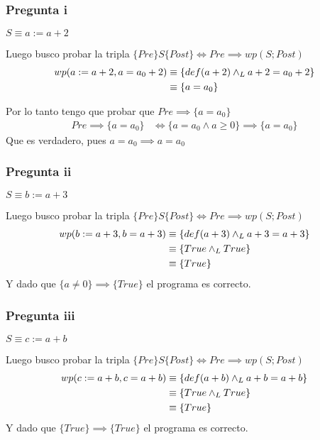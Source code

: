 \subsubsection{Pregunta i}
$ S \equiv a := a+2 $

Luego busco probar la tripla $ \{ Pre \}S\{ Post \} \iff Pre \implies wp(S; Post) $
\begin{align*}
    wp(a := a+2, a = a_0 + 2) &\equiv \{ def(a+2) \land _L a + 2 = a_0 + 2 \} \\
    &\equiv \{ a = a_0 \} \\
\end{align*}

Por lo tanto tengo que probar que $ Pre \implies \{ a = a_0 \} $
\begin{align*}
    Pre \implies \{ a = a_0 \} &\iff \{ a = a_0 \wedge a \geq 0 \} \implies \{ a = a_0 \}
\end{align*}
Que es verdadero, pues $ a = a_0 \implies a = a_0 $

\subsubsection{Pregunta ii}
$ S \equiv b := a + 3 $

Luego busco probar la tripla $ \{ Pre \}S\{ Post \} \iff Pre \implies wp(S; Post) $
\begin{align*}
    wp(b := a + 3, b = a + 3) &\equiv \{ def(a+3) \land _L a + 3 = a+3 \} \\
    &\equiv \{ True \land _L True \} \\
    &\equiv \{ True \} \\
\end{align*}
Y dado que $ \{ a \neq 0 \} \implies \{ True \} $ el programa es correcto.

\subsubsection{Pregunta iii}
$ S \equiv c := a+b $

Luego busco probar la tripla $ \{ Pre \}S\{ Post \} \iff Pre \implies wp(S; Post) $
\begin{align*}
    wp(c := a + b, c = a + b) &\equiv \{ def(a+b) \land _L a + b = a+b \} \\
    &\equiv \{ True \land _L True \} \\
    &\equiv \{ True \} \\
\end{align*}
Y dado que $ \{ True \} \implies \{ True \} $ el programa es correcto.

